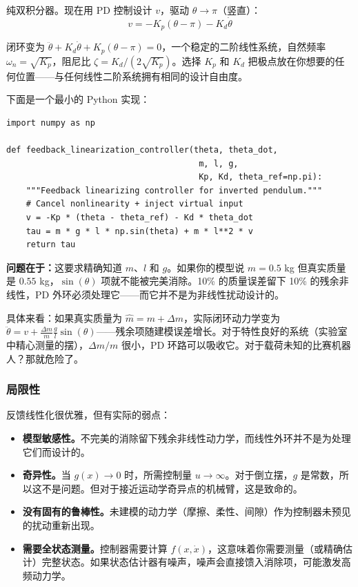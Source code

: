 纯双积分器。现在用 PD 控制设计 $v$，驱动 $\theta \to \pi$（竖直）：
\begin{equation}
v = -K_p(\theta - \pi) - K_d \dot{\theta}
\end{equation}

闭环变为 $\ddot{\theta} + K_d \dot{\theta} + K_p(\theta - \pi) = 0$，一个稳定的二阶线性系统，自然频率 $\omega_n = \sqrt{K_p}$，阻尼比 $\zeta = K_d / (2\sqrt{K_p})$。选择 $K_p$ 和 $K_d$ 把极点放在你想要的任何位置——与任何线性二阶系统拥有相同的设计自由度。

下面是一个最小的 Python 实现：

\begin{verbatim}
import numpy as np

def feedback_linearization_controller(theta, theta_dot,
                                       m, l, g,
                                       Kp, Kd, theta_ref=np.pi):
    """Feedback linearizing controller for inverted pendulum."""
    # Cancel nonlinearity + inject virtual input
    v = -Kp * (theta - theta_ref) - Kd * theta_dot
    tau = m * g * l * np.sin(theta) + m * l**2 * v
    return tau
\end{verbatim}

\textbf{问题在于：}这要求精确知道 $m$、$l$ 和 $g$。如果你的模型说 $m = 0.5$ kg 但真实质量是 $0.55$ kg，$\sin(\theta)$ 项就不能被完美消除。10\% 的质量误差留下 10\% 的残余非线性，PD 外环必须处理它——而它并不是为非线性扰动设计的。

具体来看：如果真实质量为 $\hat{m} = m + \Delta m$，实际闭环动力学变为 $\ddot{\theta} = v + \frac{\Delta m}{m} \frac{g}{l}\sin(\theta)$——残余项随建模误差增长。对于特性良好的系统（实验室中精心测量的摆），$\Delta m / m$ 很小，PD 环路可以吸收它。对于载荷未知的比赛机器人？那就危险了。

\subsubsection{局限性}

反馈线性化很优雅，但有实际的弱点：

\begin{itemize}[nosep]
    \item \textbf{模型敏感性。}不完美的消除留下残余非线性动力学，而线性外环并不是为处理它们而设计的。
    \item \textbf{奇异性。}当 $g(x) \to 0$ 时，所需控制量 $u \to \infty$。对于倒立摆，$g$ 是常数，所以这不是问题。但对于接近运动学奇异点的机械臂，这是致命的。
    \item \textbf{没有固有的鲁棒性。}未建模的动力学（摩擦、柔性、间隙）作为控制器未预见的扰动重新出现。
    \item \textbf{需要全状态测量。}控制器需要计算 $f(x, \dot{x})$，这意味着你需要测量（或精确估计）完整状态。如果状态估计器有噪声，噪声会直接馈入消除项，可能激发高频动力学。
\end{itemize}

